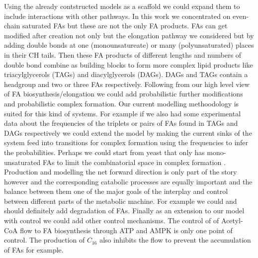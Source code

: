 Using the already contstructed models as a scaffold we could expand
them to include interactions with other pathways. In this work we
concentrated on even-chain saturated FAs but these are not the only FA
products. FAs can get modified after creation not only but the
elongation pathway we considered but by adding double bonds at one
(monounsatureate) or many (polyunsaturated) places in their CH
tails. Then these FA products of different lengths and numbers of
double bond combine as building blocks to form more complex lipid
products like triacylglycerols (TAGs) and diacylglycerols (DAGs). DAGs
and TAGs contain a headgroup and two or three FAs
respectively. Following from our high level view of FA
biosynthesis/elongation we could add probabilistic further
modifications and probabilistic complex formation. Our current
modelling methoodology is suited for this kind of systems. For example
if we also had some experimental data about the frequencies of the
triplets or pairs of FAs found in TAGs and DAGs respectively we could
extend the model by making the current sinks of the system feed into
transitions for complex formation using the frequencies to infer the
probabilities. Perhaps we could start from yeast that only has
mono-unsaturated FAs to limit the combinatorial space in complex
formation \cite [] {nielsen2009systems}. 
Production and modelling the net forward direction is only part of
the story however and the corresponding catabolic processes are
equally important and the balance between them one of the major goals
of the interplay and control between different parts of the metabolic
machine. For example we could and should definitely add degradation of
FAs. Finally as an extension to our model with control we could add
other control mechanisms. The control of of Acetyl-CoA flow to FA
biosynthesis through ATP and AMPK is only one point of control. The
production of $C_{16}$ also inhibits the flow to prevent the
accumulation of FAs for example.


